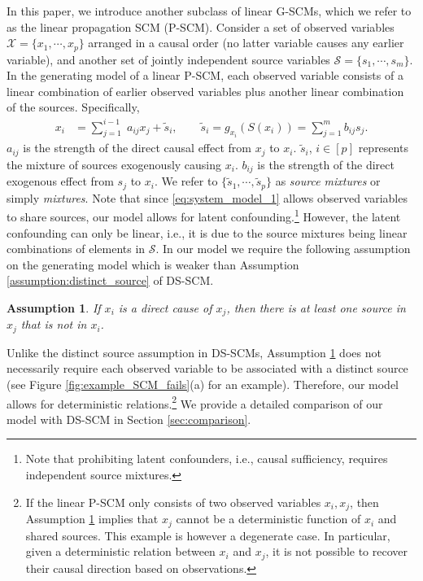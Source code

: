 \documentclass[12pt]{article}
\newtheorem{assumption}{Assumption}
\newcommand{\setX}{\mathcal{X}}
\newcommand{\setS}{\mathcal{S}}
\begin{document}
In this paper, we introduce another subclass of linear G-SCMs, which we refer to as the linear propagation SCM (P-SCM). Consider a set of observed variables $\setX=\{x_1,\cdots,x_p\}$ arranged in a causal order (no latter variable causes any earlier variable), and another set of jointly independent source variables $\setS=\{s_1,\cdots,s_m\}$. In the generating model of a linear P-SCM, each observed variable consists of a linear combination of earlier observed variables plus another linear combination of the sources. Specifically,
\vspace{-2mm}
\begin{align}
\label{eq:system_model_1}
x_i &= {{\sum}}_{j=1}^{i-1}\;a_{ij} x_j + \tilde{s}_i,\qquad \tilde{s}_i=g_{x_i}(S(x_i))={{\sum}}_{j=1}^m b_{ij}s_j.
\end{align}
$a_{ij}$ is the strength of the direct causal effect from $x_j$ to $x_i$. $\tilde{s}_i$, $i\in[p]$ represents the mixture of sources exogenously causing $x_i$. $b_{ij}$ is the strength of the direct exogenous effect from $s_j$ to $x_i$. We refer to $\{\tilde{s}_1,\cdots, \tilde{s}_p\}$ as {\it{source mixtures}} or simply {\it{mixtures}}. %
Note that since \eqref{eq:system_model_1} allows observed variables to share sources, our model allows for latent confounding.\footnote{Note that prohibiting latent confounders, i.e., causal sufficiency, requires independent source mixtures.} However, the latent confounding can only be linear, i.e., it is due to the source mixtures being linear combinations of elements in $\setS$.
In our model we require the following assumption on the generating model which is weaker than Assumption \ref{assumption:distinct_source} of DS-SCM.
\vspace{-2mm}
\begin{assumption} \label{assumption:P-SCM_connection}
If $x_i$ is a direct cause of $x_j$, then there is at least one source in $x_j$ that is not in $x_i$.
\end{assumption}
\vspace{-1mm}
Unlike the distinct source assumption in DS-SCMs, Assumption \ref{assumption:P-SCM_connection} does not necessarily require each observed variable to be associated with a distinct source (see Figure \ref{fig:example_SCM_fails}(a) for an example). Therefore, our model allows for deterministic relations.\footnote{If the linear P-SCM only consists of two observed variables $x_i, x_j$, then Assumption \ref{assumption:P-SCM_connection} implies that $x_j$ cannot be a deterministic function of $x_i$ and shared sources. This example is however a degenerate case. In particular, given a deterministic relation between $x_i$ and $x_j$, it is not possible to recover their causal direction based on observations.} We provide a detailed comparison of our model with DS-SCM in Section \ref{sec:comparison}.
\end{document}
